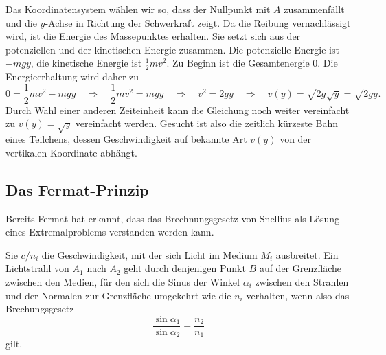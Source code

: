 Das Koordinatensystem wählen wir so, dass der Nullpunkt mit $A$ zusammenfällt
und die $y$-Achse in Richtung der Schwerkraft zeigt.
Da die Reibung vernachlässigt wird, ist die Energie des Massepunktes
erhalten.
Sie setzt sich aus der potenziellen und der kinetischen Energie
zusammen.
Die potenzielle Energie ist $-mgy$, die kinetische Energie ist
$\frac12mv^2$.
Zu Beginn ist die Gesamtenergie 0.
Die Energieerhaltung wird daher zu
\[
0=\frac12mv^2-mgy
\quad\Rightarrow\quad
\frac12mv^2=mgy
\quad\Rightarrow\quad
v^2=2gy
\quad\Rightarrow\quad
v(y)
=
\sqrt{2g}\!\sqrt{y}
=
\!\sqrt{2gy}.
\]
Durch Wahl einer anderen Zeiteinheit kann die Gleichung noch weiter
vereinfacht zu
\(
v(y) = \sqrt{y}
\)
vereinfacht werden.
Gesucht ist also die zeitlich kürzeste Bahn eines Teilchens, 
dessen Geschwindigkeit auf bekannte Art $v(y)$ von der vertikalen
Koordinate abhängt.

%
%
\subsection{Das Fermat-Prinzip}
Bereits Fermat hat erkannt, dass das Brechnungsgesetz von Snellius
als Lösung eines Extremalproblems verstanden werden kann.

\begin{satz}[Fermat]
Sie $c/n_i$ die Geschwindigkeit, mit der sich Licht im Medium $M_i$
ausbreitet.
Ein Lichtstrahl von $A_1$ nach $A_2$ geht durch denjenigen Punkt $B$ 
auf der Grenzfläche zwischen den Medien, für den sich die Sinus der
Winkel $\alpha_i$ zwischen den Strahlen und der Normalen zur Grenzfläche
umgekehrt wie die $n_i$ verhalten, wenn also das Brechungsgesetz
\[
\frac{\sin\alpha_1}{\sin\alpha_2}
=
\frac{n_2}{n_1}
\]
gilt.
\end{satz}


